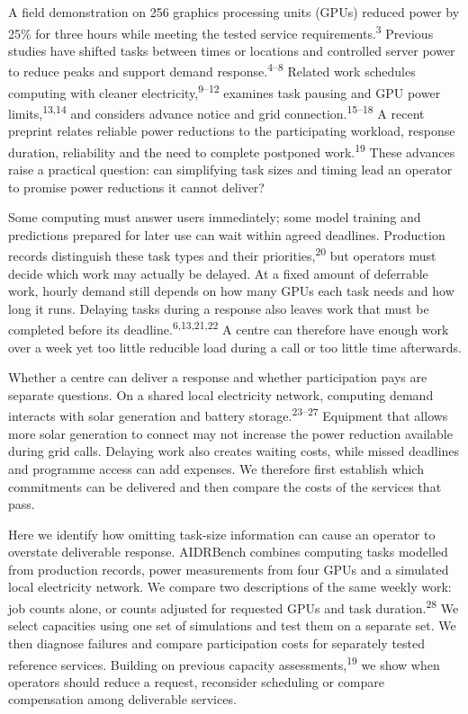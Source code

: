 \documentclass[10pt,a4paper]{article}
\begin{document}
A field demonstration on 256 graphics processing units (GPUs) reduced power by 25\% for three hours while meeting the tested service requirements.\textsuperscript{3} Previous studies have shifted tasks between times or locations and controlled server power to reduce peaks and support demand response.\textsuperscript{4–8} Related work schedules computing with cleaner electricity,\textsuperscript{9–12} examines task pausing and GPU power limits,\textsuperscript{13,14} and considers advance notice and grid connection.\textsuperscript{15–18} A recent preprint relates reliable power reductions to the participating workload, response duration, reliability and the need to complete postponed work.\textsuperscript{19} These advances raise a practical question: can simplifying task sizes and timing lead an operator to promise power reductions it cannot deliver?


Some computing must answer users immediately; some model training and predictions prepared for later use can wait within agreed deadlines. Production records distinguish these task types and their priorities,\textsuperscript{20} but operators must decide which work may actually be delayed. At a fixed amount of deferrable work, hourly demand still depends on how many GPUs each task needs and how long it runs. Delaying tasks during a response also leaves work that must be completed before its deadline.\textsuperscript{6,13,21,22} A centre can therefore have enough work over a week yet too little reducible load during a call or too little time afterwards.


Whether a centre can deliver a response and whether participation pays are separate questions. On a shared local electricity network, computing demand interacts with solar generation and battery storage.\textsuperscript{23–27} Equipment that allows more solar generation to connect may not increase the power reduction available during grid calls. Delaying work also creates waiting costs, while missed deadlines and programme access can add expenses. We therefore first establish which commitments can be delivered and then compare the costs of the services that pass.


Here we identify how omitting task-size information can cause an operator to overstate deliverable response. AIDRBench combines computing tasks modelled from production records, power measurements from four GPUs and a simulated local electricity network. We compare two descriptions of the same weekly work: job counts alone, or counts adjusted for requested GPUs and task duration.\textsuperscript{28} We select capacities using one set of simulations and test them on a separate set. We then diagnose failures and compare participation costs for separately tested reference services. Building on previous capacity assessments,\textsuperscript{19} we show when operators should reduce a request, reconsider scheduling or compare compensation among deliverable services.
\end{document}
